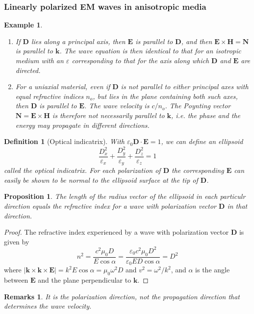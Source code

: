 \documentclass[a4paper]{article}
\newtheorem{defi}{Definition}[section]
\newtheorem{remarks}{Remarks}[section]
\newtheorem{eg}{Example}[section]
\newtheorem{prop}{Proposition}[section]
\theoremstyle{new}
\begin{document}
\subsubsection{Linearly polarized EM waves in anisotropic media}
\begin{eg}\leavevmode
\begin{enumerate}
    \item If $\mathbf{D}$ lies along a principal axis, then $\mathbf{E}$ is parallel to $\mathbf{D}$, and then $\mathbf{E}\times\mathbf{H}=\mathbf{N}$ is parallel to $\mathbf{k}$. The wave equation is then identical to that for an isotropic medium with an $\varepsilon$ corresponding to that for the axis along which $\mathbf{D}$ and $\mathbf{E}$ are directed.
    \item For a uniaxial material, even if $\mathbf{D}$ is not parallel to either principal axes with equal refractive indices $n_o$, but lies in the plane containing both such axes, then $\mathbf{D}$ is parallel to $\mathbf{E}$. The wave velocity is $c/n_o$. The Poynting vector $\mathbf{N}=\mathbf{E}\times\mathbf{H}$ is therefore not necessarily parallel to $\mathbf{k}$, i.e. the phase and the energy may propagate in different directions.
\end{enumerate}
\end{eg}
\begin{defi}[Optical indicatrix]
With $\varepsilon_0\mathbf{D}\cdot\mathbf{E}=1$, we can define an ellipsoid
$$\frac{D_x^2}{\varepsilon_x}+\frac{D_y^2}{\varepsilon_y}+\frac{D_z^2}{\varepsilon_z}=1$$
called the optical indicatrix. For each polarization of $\mathbf{D}$ the corresponding $\mathbf{E}$ can easily be shown to be normal to the ellipsoid surface at the tip of $\mathbf{D}$.
\end{defi}
\begin{prop}
The length of the radius vector of the ellipsoid in each particulr direction equals the refractive index for a wave with polarization vector $\mathbf{D}$ in that direction.
\end{prop}
\begin{proof}
The refractive index experienced by a wave with polarization vector $\mathbf{D}$ is given by
$$n^2=\frac{c^2\mu_0D}{E\cos\alpha}=\frac{\varepsilon_0c^2\mu_0D^2}{\varepsilon_0ED\cos\alpha}=D^2$$
where $|\mathbf{k}\times\mathbf{k}\times\mathbf{E}|=k^2E\cos\alpha=\mu_0\omega^2D$ and $v^2=\omega^2/k^2$, and $\alpha$ is the angle between $\mathbf{E}$ and the plane perpendicular to $\mathbf{k}$.
\end{proof}
\begin{remarks}
It is the polarization direction, not the propagation direction that determines the wave velocity.
\end{remarks}
\end{document}
